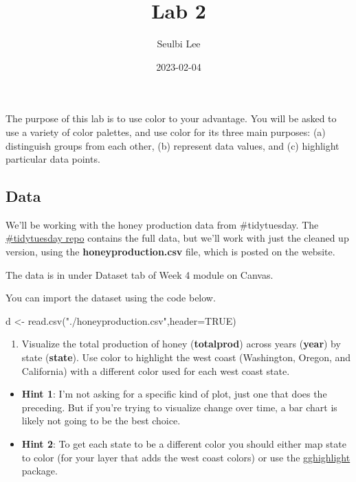 \documentclass[
]{article}
\title{Lab 2}
\author{Seulbi Lee}
\date{2023-02-04}
\newenvironment{Shaded}{\begin{snugshade}}{\end{snugshade}}
\newcommand{\AttributeTok}[1]{\textcolor[rgb]{0.77,0.63,0.00}{#1}}
\newcommand{\ConstantTok}[1]{\textcolor[rgb]{0.00,0.00,0.00}{#1}}
\newcommand{\FunctionTok}[1]{\textcolor[rgb]{0.00,0.00,0.00}{#1}}
\newcommand{\NormalTok}[1]{#1}
\newcommand{\OtherTok}[1]{\textcolor[rgb]{0.56,0.35,0.01}{#1}}
\newcommand{\StringTok}[1]{\textcolor[rgb]{0.31,0.60,0.02}{#1}}
\providecommand{\tightlist}{%
  \setlength{\itemsep}{0pt}\setlength{\parskip}{0pt}}
\begin{document}
\maketitle

The purpose of this lab is to use color to your advantage. You will be
asked to use a variety of color palettes, and use color for its three
main purposes: (a) distinguish groups from each other, (b) represent
data values, and (c) highlight particular data points.

\hypertarget{data}{%
\subsection{Data}\label{data}}

We'll be working with the honey production data from \#tidytuesday. The
\href{https://github.com/rfordatascience/tidytuesday/tree/master/data/2018/2018-05-21}{\#tidytuesday
repo} contains the full data, but we'll work with just the cleaned up
version, using the \textbf{honeyproduction.csv} file, which is posted on
the website.

The data is in under Dataset tab of Week 4 module on Canvas.

You can import the dataset using the code below.

\begin{Shaded}
\begin{Highlighting}[]
\NormalTok{d }\OtherTok{\textless{}{-}} \FunctionTok{read.csv}\NormalTok{(}\StringTok{"./honeyproduction.csv"}\NormalTok{,}\AttributeTok{header=}\ConstantTok{TRUE}\NormalTok{)}
\end{Highlighting}
\end{Shaded}

\begin{enumerate}
\def\labelenumi{\arabic{enumi}.}
\tightlist
\item
  Visualize the total production of honey (\textbf{totalprod}) across
  years (\textbf{year}) by state (\textbf{state}). Use color to
  highlight the west coast (Washington, Oregon, and California) with a
  different color used for each west coast state.
\end{enumerate}

\begin{itemize}
\tightlist
\item
  \textbf{Hint 1}: I'm not asking for a specific kind of plot, just one
  that does the preceding. But if you're trying to visualize change over
  time, a bar chart is likely not going to be the best choice.
\item
  \textbf{Hint 2}: To get each state to be a different color you should
  either map state to color (for your layer that adds the west coast
  colors) or use the
  \href{https://yutannihilation.github.io/gghighlight/index.html}{gghighlight}
  package.
\end{itemize}
\end{document}
